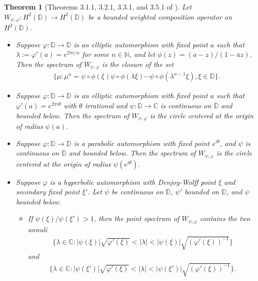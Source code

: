 \documentclass{amsart}
\newtheorem{thm}{Theorem}[section]
\theoremstyle{definition}
\theoremstyle{remark}
\numberwithin{equation}{section}
\begin{document}
\begin{thm}[Theorems 3.1.1, 3.2.1, 3.3.1, and 3.5.1 of \cite{gunatillake2011invertible}]\label{spectrum_WCO}
    Let $W_{\psi,\varphi}:H^{2}(\mathbb{D})\to H^{2}(\mathbb{D})$ be a bounded weighted composition operator on $H^{2}(\mathbb{D})$. 
    \begin{itemize}
        \item[1.] Suppose $\varphi:\mathbb{D}\to\mathbb{D}$ is an elliptic automorphism with fixed point $a$ such that $\lambda:=\varphi'(a)=e^{2\pi i/n}$ for some $n\in\mathbb{N}$, and let $\phi(z)=(a-z)/(1-\overline{a}z)$. Then the spectrum of $W_{\psi,\varphi}$ is the closure of the set 
        \begin{align*}
            \{\mu:\mu^{n}=\psi\circ\phi(\xi)\psi\circ\phi(\lambda\xi)\cdots\psi\circ\phi(\lambda^{n-1}\xi),\xi\in\mathbb{D}\}.
        \end{align*}
        \item[2.] Suppose $\varphi:\mathbb{D}\to\mathbb{D}$ is an elliptic automorphism with fixed point $a$ such that $\varphi'(a)=e^{2\pi i\theta}$ with $\theta$ irrational and $\psi:\mathbb{D}\to\mathbb{C}$ is continuous on $\overline{\mathbb{D}}$ and bounded below. Then the spectrum of $W_{\psi,\varphi}$ is the circle centered at the origin of radius $\psi(a)$. 
        \item[3.] Suppose $\varphi:\mathbb{D}\to\mathbb{D}$ is a parabolic automorphism with fixed point $e^{i\theta}$, and $\psi$ is continuous on $\overline{\mathbb{D}}$ and bounded below. Then the spectrum of $W_{\psi,\varphi}$ is the circle centered at the origin of radius $\psi(e^{i\theta})$. 
        \item[4.] Suppose $\varphi$ is a hyperbolic automorphism with Denjoy-Wolff point $\xi$ and secondary fixed point $\xi'$. Let $\psi$ be continuous on $\overline{\mathbb{D}}$, $\psi'$  bounded on $\mathbb{D}$, and $\psi$ bounded below.  
        \begin{itemize}
            \item[a.] If $\psi(\xi)/\psi(\xi')>1$, then the point spectrum of $W_{\psi,\varphi}$ contains the two annuli
            \begin{align*}
                \{\lambda \in \mathbb{C}:|\psi(\xi)|\sqrt{\varphi'(\xi)}<|\lambda|<|\psi(\xi)|\sqrt{\left(\varphi'(\xi)\right)^{-1}}\}
            \end{align*}
            and
            \begin{align*}
                \{\lambda \in \mathbb{C}:|\psi(\xi')|\sqrt{\varphi'(\xi)}<|\lambda|<|\psi(\xi')|\sqrt{\left(\varphi'(\xi)\right)^{-1}}\}.

\end{align*}
\end{itemize}
\end{itemize}
\end{thm}
\end{document}
